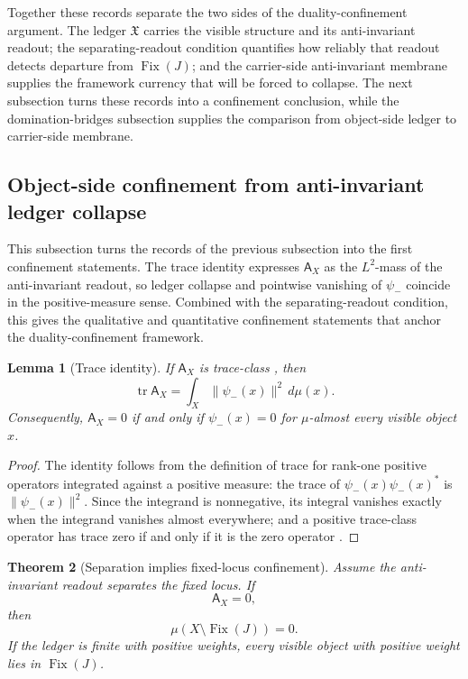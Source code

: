 \documentclass[11pt]{article}
\DeclareMathOperator{\tr}{tr}
\newcommand{\Fix}{\operatorname{Fix}}
\newtheorem{theorem}{Theorem}[section]
\newtheorem{lemma}[theorem]{Lemma}
\theoremstyle{definition}
\begin{document}
Together these records separate the two sides of the
duality-confinement argument.  The ledger \(\mathfrak X\) carries the
visible structure and its anti-invariant readout; the separating-readout
condition quantifies how reliably that readout detects departure from
\(\Fix(J)\); and the carrier-side anti-invariant membrane supplies the
framework currency that will be forced to collapse.  The next subsection
turns these records into a confinement conclusion, while the
domination-bridges subsection supplies the comparison from object-side
ledger to carrier-side membrane.

\subsection{Object-side confinement from anti-invariant ledger collapse}

This subsection turns the records of the previous subsection into the
first confinement statements.  The trace identity expresses
\(\mathsf A_X\) as the \(L^2\)-mass of the anti-invariant readout, so
ledger collapse and pointwise vanishing of \(\psi_-\) coincide in the
positive-measure sense.  Combined with the separating-readout condition,
this gives the qualitative and quantitative confinement statements that
anchor the duality-confinement framework.

\begin{lemma}[Trace identity]\label{lem:main:trace-identity}
If \(\mathsf A_X\) is trace-class \citep{Simon2005TraceIdeals}, then
\[
  \tr\mathsf A_X=\int_X \|\psi_-(x)\|^2\,d\mu(x).
\]
Consequently, \(\mathsf A_X=0\) if and only if \(\psi_-(x)=0\) for
\(\mu\)-almost every visible object \(x\).
\end{lemma}

\begin{proof}
The identity follows from the definition of trace for rank-one positive
operators integrated against a positive measure: the trace of
\(\psi_-(x)\psi_-(x)^*\) is \(\|\psi_-(x)\|^2\).  Since the integrand is
nonnegative, its integral vanishes exactly when the integrand vanishes
almost everywhere; and a positive trace-class operator has trace zero
if and only if it is the zero operator
\citep{ReedSimon1980FunctionalAnalysis}.
\end{proof}

\begin{theorem}[Separation implies fixed-locus confinement]\label{thm:main:separation-confinement}
Assume the anti-invariant readout separates the fixed locus.  If
\[
  \mathsf A_X=0,
\]
then
\[
  \mu(X\setminus\Fix(J))=0.
\]
If the ledger is finite with positive weights, every visible object with
positive weight lies in \(\Fix(J)\).
\end{theorem}
\end{document}
